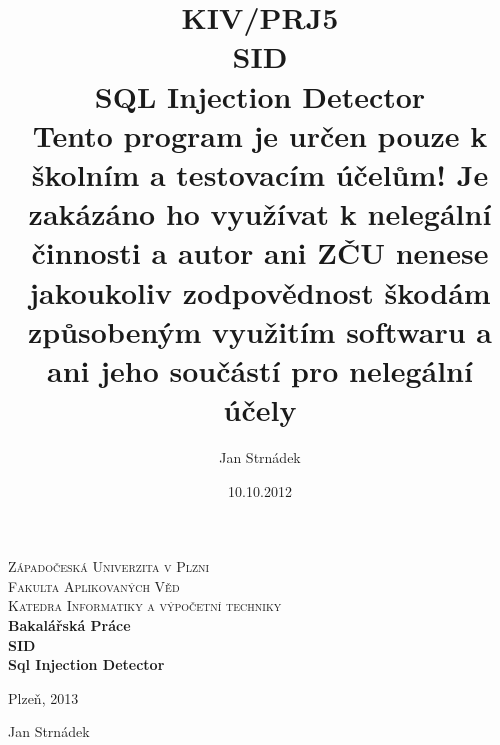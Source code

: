 \documentclass[12pt, a4paper]{report}
\begin{document}
\author{Jan Strnádek}
\date{10.10.2012}
\title{KIV/PRJ5\\SID\\\small{SQL Injection Detector\\Tento program je určen pouze k školním a testovacím účelům! Je zakázáno ho využívat k nelegální činnosti a autor ani ZČU nenese jakoukoliv zodpovědnost škodám způsobeným využitím softwaru a ani jeho součástí pro nelegální účely}}
\begin{titlepage}
\begin{center}
\textsc{\Large Západočeská Univerzita v Plzni}
\\[0.3cm]
\textsc{\Large Fakulta Aplikovaných Věd}
\\[0.3cm]
\textsc{\Large Katedra Informatiky a výpočetní techniky}
\\[6cm]
\textbf{\LARGE Bakalářská Práce}
\\[3cm]
\textbf{\LARGE SID\\[0.3cm] Sql Injection Detector}
\\[7cm]
\begin{minipage}{0.4\textwidth}
\begin{flushleft}
\large
Plzeň, 2013
\end{flushleft}
\end{minipage}
\begin{minipage}{0.4\textwidth}
\begin{flushright} 
Jan Strnádek
\end{flushright}
\end{minipage}
\vfill
\end{center}
\end{titlepage}
\tableofcontents
\end{document}
